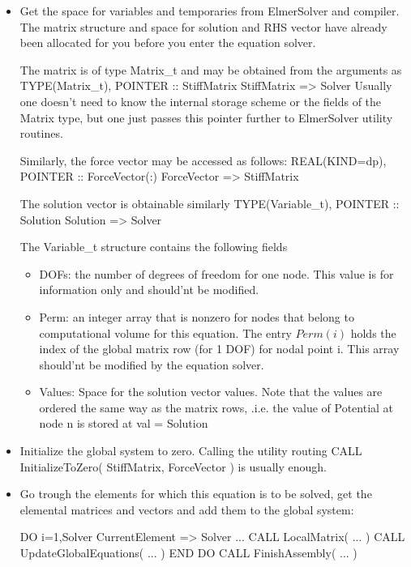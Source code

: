 \begin{itemize}
\item Get the space for variables and temporaries from ElmerSolver and compiler.
The matrix structure and space for solution and RHS vector have already been
allocated for you before you enter the equation solver.

The matrix is of type Matrix\_t and may be obtained from the arguments as
\ttbegin
TYPE(Matrix_t), POINTER :: StiffMatrix
StiffMatrix => Solver %
\ttend
Usually one doesn't need to know the internal storage scheme or the fields
of the Matrix type, but one just passes this pointer further to ElmerSolver
utility routines.

Similarly, the force vector may be accessed as follows:
\ttbegin
REAL(KIND=dp), POINTER :: ForceVector(:)
ForceVector => StiffMatrix %
\ttend

The solution vector is obtainable similarly
\ttbegin
TYPE(Variable_t), POINTER :: Solution
Solution => Solver %
\ttend

The Variable\_t structure contains the following fields
\begin{itemize}
\item DOFs: the number of degrees of freedom for one node. This value is for
information only and should'nt be modified.
\item Perm: an integer array that is nonzero for nodes that belong
to computational volume for this equation. The entry $Perm(i)$ holds
the index of the global matrix row  (for 1 DOF) for nodal point i.
This array  should'nt be modified by the equation solver.
\item Values: Space for the solution vector values.
Note that the values
are ordered the same way as the matrix rows, .i.e. the value of Potential at node
n is stored at
\ttbegin
  val = Solution %
\ttend
\end{itemize}


\item Initialize the global system to zero. Calling the utility routing
\ttbegin
CALL InitializeToZero( StiffMatrix, ForceVector )
\ttend
is usually enough.


\item Go trough the elements for which this equation is to 
be solved, get the elemental matrices and vectors and add them to
the global system:

\ttbegin
DO i=1,Solver %
   CurrentElement => Solver %
      ...
   CALL LocalMatrix( ... )
   CALL UpdateGlobalEquations( ... )
END DO
CALL FinishAssembly( ... )
\ttend


\end{itemize}
